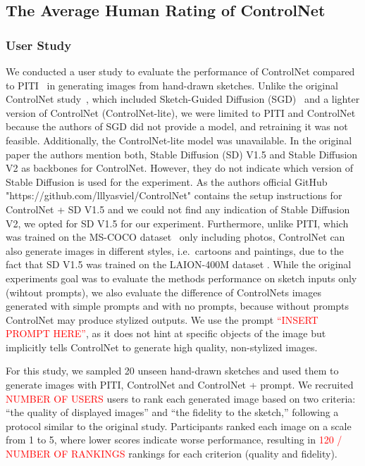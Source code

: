 \subsection{The Average Human Rating of ControlNet}
\subsubsection{User Study}

We conducted a user study to evaluate the performance of ControlNet compared to PITI~\cite{wang2022pretrainingneedimagetoimagetranslation} in generating images from hand-drawn sketches. Unlike the original ControlNet study~\cite{zhang2023addingconditionalcontroltexttoimage}, which included Sketch-Guided Diffusion (SGD)~\cite{voynov2022sketchguidedtexttoimagediffusionmodels} and a lighter version of ControlNet (ControlNet-lite), we were limited to PITI and ControlNet because the authors of SGD did not provide a model, and retraining it was not feasible. Additionally, the ControlNet-lite model was unavailable. In the original paper the authors mention both, Stable Diffusion (SD) V1.5 and Stable Diffusion V2 as backbones for ControlNet. However, they do not indicate which version of Stable Diffusion is used for the experiment. As the authors official GitHub "https://github.com/lllyasviel/ControlNet" contains the setup instructions for ControlNet + SD V1.5 and we could not find any indication of Stable Diffusion V2, we opted for SD V1.5 for our experiment. Furthermore, unlike PITI, which was trained on the MS-COCO dataset~\cite{lin2015microsoftcococommonobjects} only including photos, ControlNet can also generate images in different styles, i.e.\ cartoons and paintings, due to the fact that SD V1.5 was trained on the LAION-400M dataset \cite{schuhmann2021laion400mopendatasetclipfiltered}. While the original experiments goal was to evaluate the methods performance on sketch inputs only (wihtout prompts), we also evaluate the difference of ControlNets images generated with simple prompts and with no prompts, because without prompts ControlNet may produce stylized outputs. We use the prompt \textcolor{red}{``INSERT PROMPT HERE''}, as it does not hint at specific objects of the image but implicitly tells ControlNet to generate high quality, non-stylized images. 

For this study, we sampled 20 unseen hand-drawn sketches and used them to generate images with PITI, ControlNet and ControlNet + prompt. We recruited \textcolor{red}{NUMBER OF USERS} users to rank each generated image based on two criteria: “the quality of displayed images” and “the fidelity to the sketch,” following a protocol similar to the original study. Participants ranked each image on a scale from 1 to 5, where lower scores indicate worse performance, resulting in \textcolor{red}{120 / NUMBER OF RANKINGS} rankings for each criterion (quality and fidelity).

